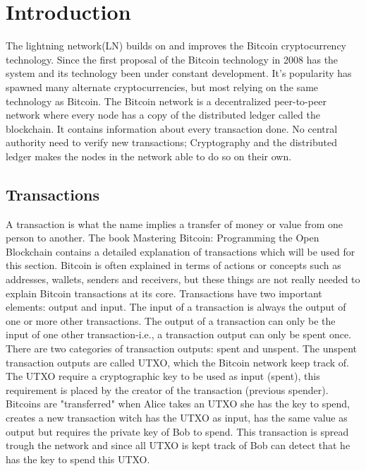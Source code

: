 \documentclass[informationsecurity]{gucmasterproject}
\begin{document}
\chapter{Introduction}

The lightning network(LN) builds on and improves the Bitcoin cryptocurrency technology. 
Since the first proposal of the Bitcoin technology in 2008\cite{nakamoto2008bitcoin} has the system and its technology been under constant development. It's popularity has spawned many alternate cryptocurrencies, but most relying on the same technology as Bitcoin. The Bitcoin network is a decentralized peer-to-peer network where every node has a copy of the distributed ledger called the blockchain. It contains information about every transaction done. No central authority need to verify new transactions; Cryptography and the distributed ledger makes the nodes in the network able to do so on their own.

\section{Transactions}
A transaction is what the name implies a transfer of money or value from one person to another. The book Mastering Bitcoin: Programming the Open Blockchain \cite{antonopoulos2017mastering} contains a detailed explanation of transactions which will be used for this section. Bitcoin is often explained in terms of actions or concepts such as addresses, wallets, senders and receivers, but these things are not really needed to explain Bitcoin transactions at its core. Transactions have two important elements: output and input. The input of a transaction is always the output of one or more other transactions. The output of a transaction can only be the input of one other transaction-i.e., a transaction output can only be spent once. There are two categories of transaction outputs: spent and unspent. The unspent transaction outputs are called UTXO, which the Bitcoin network keep track of. The UTXO require a cryptographic key to be used as input (spent), this requirement is placed by the creator of the transaction (previous spender). Bitcoins are "transferred" when Alice takes an UTXO she has the key to spend, creates a new transaction witch has the UTXO as input, has the same value as output but requires the private key of Bob to spend. This transaction is spread trough the network and since all UTXO is kept track of Bob can detect that he has the key to spend this UTXO.
\end{document}
